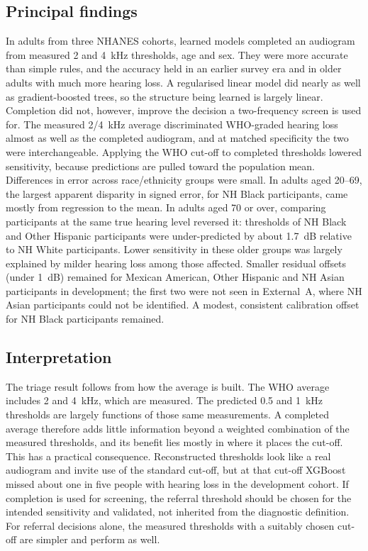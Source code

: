 \documentclass[11pt]{article}
\begin{document}
\subsection*{Principal findings}
In \NTotal{} adults from three NHANES cohorts, learned models completed an audiogram from measured 2 and 4~kHz thresholds, age and sex. They were more accurate than simple rules, and the accuracy held in an earlier survey era and in older adults with much more hearing loss. A regularised linear model did nearly as well as gradient-boosted trees, so the structure being learned is largely linear. Completion did not, however, improve the decision a two-frequency screen is used for. The measured 2/4~kHz average discriminated WHO-graded hearing loss almost as well as the completed audiogram, and at matched specificity the two were interchangeable. Applying the WHO cut-off to completed thresholds lowered sensitivity, because predictions are pulled toward the population mean. Differences in error across race/ethnicity groups were small. In adults aged 20--69, the largest apparent disparity in signed error, for NH Black participants, came mostly from regression to the mean. In adults aged 70 or over, comparing participants at the same true hearing level reversed it: thresholds of NH Black and Other Hispanic participants were under-predicted by about 1.7~dB relative to NH White participants. Lower sensitivity in these older groups was largely explained by milder hearing loss among those affected. Smaller residual offsets (under 1~dB) remained for Mexican American, Other Hispanic and NH Asian participants in development; the first two were not seen in External~A, where NH Asian participants could not be identified. A modest, consistent calibration offset for NH Black participants remained.

\subsection*{Interpretation}
The triage result follows from how the average is built. The WHO average includes 2 and 4~kHz, which are measured. The predicted 0.5 and 1~kHz thresholds are largely functions of those same measurements. A completed average therefore adds little information beyond a weighted combination of the measured thresholds, and its benefit lies mostly in where it places the cut-off. This has a practical consequence. Reconstructed thresholds look like a real audiogram and invite use of the standard cut-off, but at that cut-off XGBoost missed about one in five people with hearing loss in the development cohort. If completion is used for screening, the referral threshold should be chosen for the intended sensitivity and validated, not inherited from the diagnostic definition. For referral decisions alone, the measured thresholds with a suitably chosen cut-off are simpler and perform as well.
\end{document}
